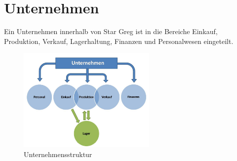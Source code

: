 \section{Unternehmen}
\label{sec:spielwelt-unternehmen}


Ein Unternehmen innerhalb von Star Greg ist in die Bereiche Einkauf, Produktion, Verkauf, Lagerhaltung, Finanzen und Personalwesen eingeteilt. 

\begin{figure}[htbp]
\centering
\includegraphics[width=0.6\textwidth]{20_Spielwelt/20_Unternehmen/Unternehmensstruktur.jpg}
\caption{Unternehmensstruktur}
\end{figure}

